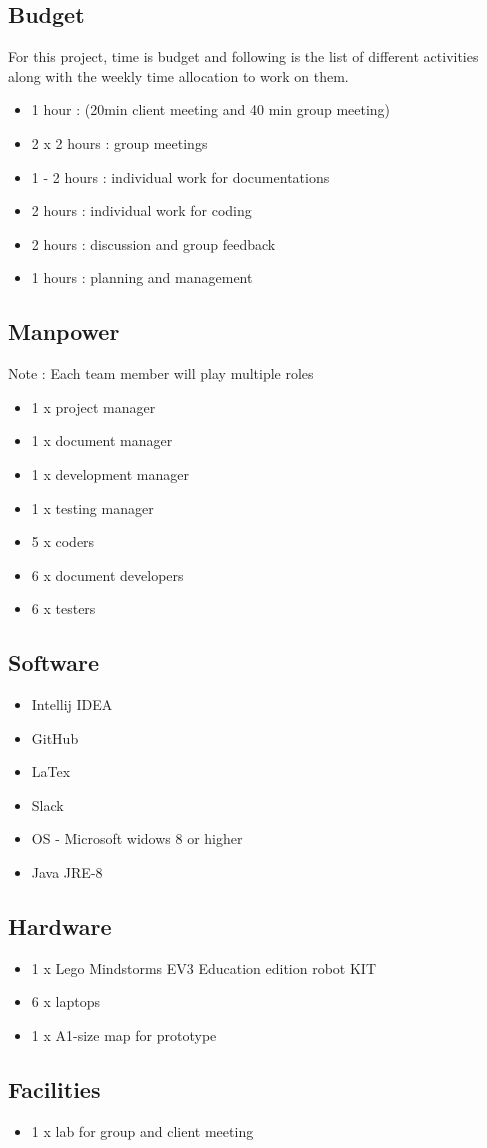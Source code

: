 \subsection{Budget}
For this project, time is budget and following is the list of different activities along with the weekly time allocation to work on them.  
\begin{itemize}
\item 1 hour  : (20min client meeting and 40 min group meeting)
\item 2 x 2 hours : group meetings 
\item 1 - 2 hours : individual work for documentations
\item 2 hours : individual work for coding 
\item 2 hours : discussion and group feedback  
\item 1 hours : planning and management
\end{itemize}

\subsection{Manpower}
Note : Each team member will play multiple roles 
\begin{itemize}
\item 1 x project manager
\item 1 x document manager
\item 1 x development manager
\item 1 x testing manager
\item 5 x coders
\item 6 x document developers
\item 6 x testers
\end{itemize}
\subsection{Software}
\begin{itemize}
\item Intellij IDEA
\item GitHub
\item LaTex
\item Slack
\item OS - Microsoft widows 8 or higher
\item Java JRE-8
\end{itemize}

\subsection{Hardware}
\begin{itemize}
\item 1 x Lego Mindstorms EV3 Education edition robot KIT
\item 6 x laptops
\item 1 x A1-size map for prototype
\end{itemize}

\subsection{Facilities}
\begin{itemize}
\item 1 x lab for group and client meeting 
\end{itemize}
